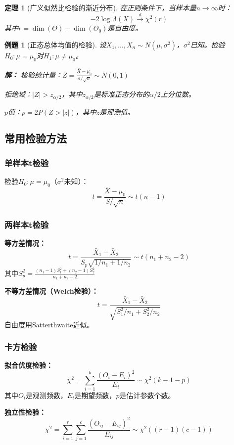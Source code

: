 \documentclass[12pt,a4paper]{article}
\newtheorem{theorem}{定理}[section]
\newtheorem{example}{例题}[section]
\theoremstyle{remark}
\begin{document}
\begin{theorem}[广义似然比检验的渐近分布]
在正则条件下，当样本量$n \to \infty$时：
$$-2\log\Lambda(X) \stackrel{d}{\to} \chi^2(r)$$
其中$r = \dim(\Theta) - \dim(\Theta_0)$是自由度。
\end{theorem}

\begin{example}[正态总体均值的检验]
设$X_1, \ldots, X_n \sim N(\mu, \sigma^2)$，$\sigma^2$已知。检验$H_0: \mu = \mu_0$对$H_1: \mu \neq \mu_0$。

\textbf{解：}
检验统计量：$Z = \frac{\bar{X} - \mu_0}{\sigma/\sqrt{n}} \sim N(0,1)$

拒绝域：$|Z| > z_{\alpha/2}$，其中$z_{\alpha/2}$是标准正态分布的$\alpha/2$上分位数。

$p$值：$p = 2P(Z > |z|)$，其中$z$是观测值。
\end{example}

\subsection{常用检验方法}

\subsubsection{单样本t检验}

检验$H_0: \mu = \mu_0$（$\sigma^2$未知）：
$$t = \frac{\bar{X} - \mu_0}{S/\sqrt{n}} \sim t(n-1)$$

\subsubsection{两样本t检验}

\textbf{等方差情况：}
$$t = \frac{\bar{X}_1 - \bar{X}_2}{S_p\sqrt{1/n_1 + 1/n_2}} \sim t(n_1 + n_2 - 2)$$
其中$S_p^2 = \frac{(n_1-1)S_1^2 + (n_2-1)S_2^2}{n_1 + n_2 - 2}$

\textbf{不等方差情况（Welch检验）：}
$$t = \frac{\bar{X}_1 - \bar{X}_2}{\sqrt{S_1^2/n_1 + S_2^2/n_2}}$$
自由度用Satterthwaite近似。

\subsubsection{卡方检验}

\textbf{拟合优度检验：}
$$\chi^2 = \sum_{i=1}^k \frac{(O_i - E_i)^2}{E_i} \sim \chi^2(k-1-p)$$
其中$O_i$是观测频数，$E_i$是期望频数，$p$是估计参数个数。

\textbf{独立性检验：}
$$\chi^2 = \sum_{i=1}^r \sum_{j=1}^c \frac{(O_{ij} - E_{ij})^2}{E_{ij}} \sim \chi^2((r-1)(c-1))$$
\end{document}
